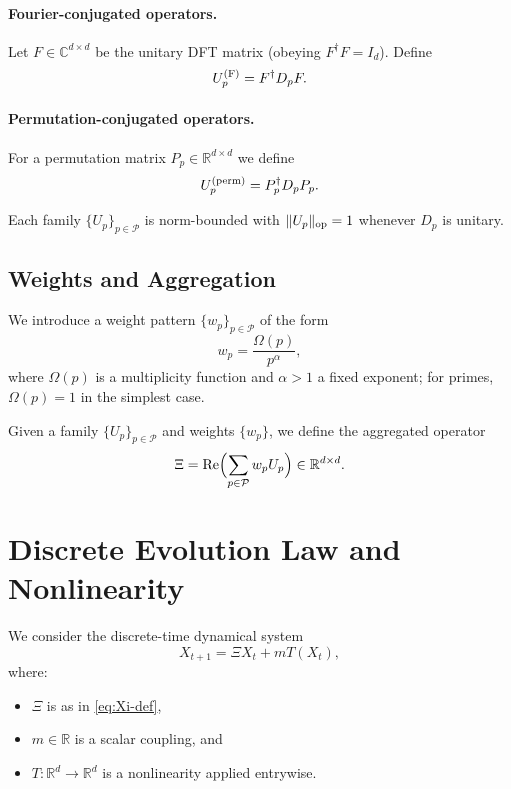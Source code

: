 \documentclass[11pt,letterpaper]{article}
\begin{document}
\paragraph{Fourier-conjugated operators.}
Let \(F\in\mathbb{C}^{d\times d}\) be the unitary DFT matrix
(obeying \(F^\dagger F = I_d\)). Define
\[
  U_p^{\rm (F)} = F^\dagger D_p F.
\]

\paragraph{Permutation-conjugated operators.}
For a permutation matrix \(P_p\in\mathbb{R}^{d\times d}\) we define
\[
  U_p^{\rm (perm)} = P_p^\dagger D_p P_p.
\]

Each family \(\{U_p\}_{p\in\mathcal{P}}\) is norm-bounded with
\(\|U_p\|_{\rm op} = 1\) whenever \(D_p\) is unitary.

\subsection{Weights and Aggregation}

We introduce a weight pattern \(\{w_p\}_{p\in\mathcal{P}}\) of the form
\[
  w_p = \frac{\Omega(p)}{p^\alpha},
\]
where \(\Omega(p)\) is a multiplicity function and \(\alpha > 1\) a fixed
exponent; for primes, \(\Omega(p)=1\) in the simplest case.

Given a family \(\{U_p\}_{p\in\mathcal{P}}\) and weights \(\{w_p\}\),
we define the aggregated operator
\begin{equation}
  \Xi = \operatorname{Re}\Bigl(\sum_{p\in\mathcal{P}} w_p U_p\Bigr)
  \in \mathbb{R}^{d\times d}.
  \label{eq:Xi-def}
\end{equation}

\section{Discrete Evolution Law and Nonlinearity}

We consider the discrete-time dynamical system
\begin{equation}
  X_{t+1} = \Xi X_t + m T(X_t),
  \label{eq:evolution}
\end{equation}
where:

\begin{itemize}[leftmargin=*]
  \item \(\Xi\) is as in \eqref{eq:Xi-def},
  \item \(m\in\mathbb{R}\) is a scalar coupling, and
  \item \(T: \mathbb{R}^d\to\mathbb{R}^d\) is a nonlinearity applied entrywise.
\end{itemize}
\end{document}
